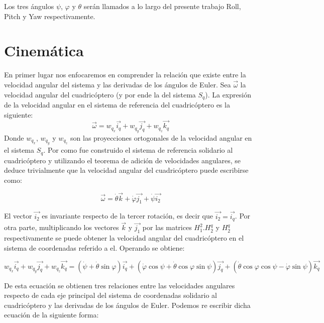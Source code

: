 \documentclass[main]{subfiles}
\begin{document}
Los tres \'angulos $\psi$, $\varphi$ y $\theta$ ser\'an llamados a lo largo del presente trabajo Roll, Pitch y Yaw respectivamente.

\section{Cinem\'atica}
En primer lugar nos enfocaremos en comprender la relaci\'on que existe entre la velocidad angular del sistema y las derivadas de los \'angulos de Euler. Sea $\vec{\omega}$ la velocidad angular del cuadric\'optero (y por ende la del sistema $S_q$). La expresi\'on de la velocidad angular en el sistema de referencia del cuadric\'optero es la siguiente:
\begin{equation}
\vec{\omega}=w_{q_x}\vec{i_q}+w_{q_y}\vec{j_q}+w_{q_z}\vec{k_q}
\end{equation}
Donde $w_{q_x}$, $w_{q_y}$ y $w_{q_z}$ son las proyecciones ortogonales de la velocidad angular en el sistema $S_q$.
Por como fue construido el sistema de referencia solidario al cuadric\'optero y utilizando el teorema de adici\'on de velocidades angulares, se deduce trivialmente que la velocidad angular del cuadric\'optero puede escribirse como:

\begin{equation}
\vec{\omega}=\dot{\theta}\vec{k}+\dot{\varphi}\vec{j_1}+\dot{\psi}\vec{i_2}
\end{equation}

El vector $\vec{i_2}$ es invariante respecto de la tercer rotaci\'on, es decir que $\vec{i_2}=\vec{i_q}$. Por otra parte, multiplicando los vectores $\vec{k}$ y $\vec{j_1}$ por las matrices $H_1^2.H_2^q$ y $H_2^q$ respectivamente se puede obtener la velocidad angular del cuadric\'optero en el sistema de coordenadas referido a el. Operando se obtiene:


\begin{equation}
w_{q_x}\vec{i_q}+w_{q_y}\vec{j_q}+w_{q_z}\vec{k_q}= (\dot{\psi}  +    \dot{\theta}\sin\varphi)\vec{i_q}+(\dot{\varphi}\cos\psi + \dot{\theta}\cos\varphi \sin\psi)\vec{j_q}+(\dot{\theta}\cos\varphi \cos\psi -  \dot{\varphi}\sin\psi)\vec{k_q}
\end{equation}

De esta ecuaci\'on se obtienen tres relaciones entre las velocidades angulares respecto de cada eje principal del sistema de coordenadas solidario al  cuadric\'optero y las derivadas de los \'angulos de Euler. Podemos re escribir dicha ecuaci\'on de la siguiente forma:
\end{document}
